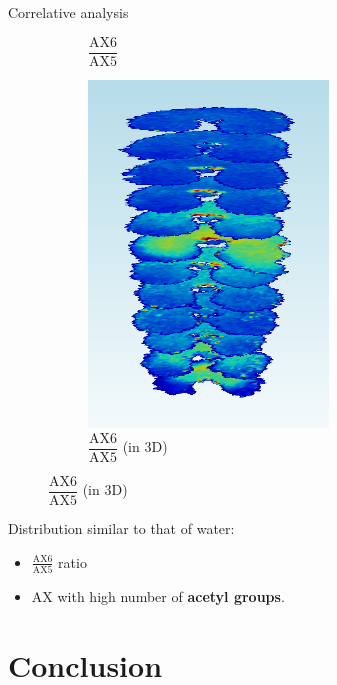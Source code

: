 \documentclass[10pt]{beamer}
\begin{document}
\begin{frame}{Correlative analysis}
\begin{figure}[ht]
\begin{subfigure}[t]{0.33\textwidth}
      \caption{$\dfrac{\text{AX6}}{\text{AX5}}$}
      \label{subfig:zonetir_0}
    \end{subfigure}%
    \begin{subfigure}[t]{0.33\textwidth}
      \centering
      \includegraphics[width=0.7\textwidth]{fig/3D_250DJ}
      \caption{$\dfrac{\text{AX6}}{\text{AX5}}$ (in 3D)}
      \label{subfig:3D_250DJ}
    \end{subfigure}%

  \end{figure}

  Distribution similar to that of water:
  \begin{itemize}
  \item $\frac{\text{AX6}}{\text{AX5}}$ ratio
  \item AX with high number of \textbf{acetyl groups}.
  \end{itemize}


\end{frame}



\section{Conclusion}
\end{document}
